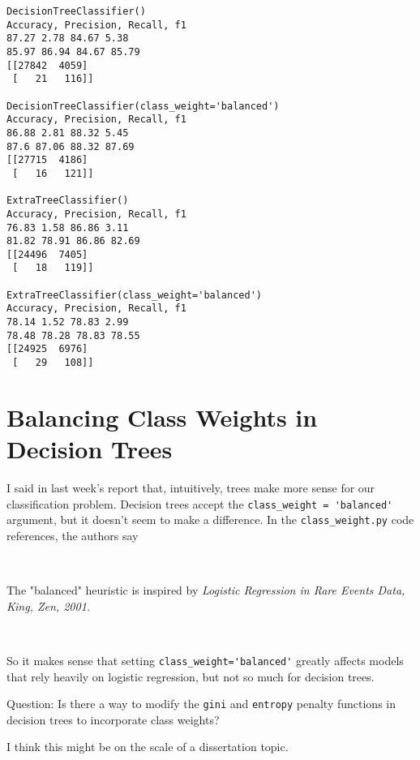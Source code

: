 \documentclass[11pt]{article}
\begin{document}
\begin{spacing}{1.2}
\begin{verbatim}
DecisionTreeClassifier()
Accuracy, Precision, Recall, f1
87.27 2.78 84.67 5.38
85.97 86.94 84.67 85.79
[[27842  4059]
 [   21   116]]

DecisionTreeClassifier(class_weight='balanced')
Accuracy, Precision, Recall, f1
86.88 2.81 88.32 5.45
87.6 87.06 88.32 87.69
[[27715  4186]
 [   16   121]]

ExtraTreeClassifier()
Accuracy, Precision, Recall, f1
76.83 1.58 86.86 3.11
81.82 78.91 86.86 82.69
[[24496  7405]
 [   18   119]]

ExtraTreeClassifier(class_weight='balanced')
Accuracy, Precision, Recall, f1
78.14 1.52 78.83 2.99
78.48 78.28 78.83 78.55
[[24925  6976]
 [   29   108]]
\end{verbatim}

\section{Balancing Class Weights in Decision Trees}

I said in last week's report that, intuitively, trees make more sense for our classification problem.  Decision trees accept the \verb|class_weight = 'balanced'| argument, but it doesn't seem to make a difference.  In the \verb|class_weight.py| code references, the authors say

\

The "balanced" heuristic is inspired by {\it Logistic Regression in Rare Events Data, King, Zen, 2001.}

\

So it makes sense that setting \verb|class_weight='balanced'| greatly affects models that rely heavily on logistic regression, but not so much for decision trees.  

Question:  Is there a way to modify the \verb|gini| and \verb|entropy| penalty functions in decision trees to incorporate class weights?

I think this might be on the scale of a dissertation topic.  



\clearpage
{}
\printindex

\end{spacing}
\end{document}
